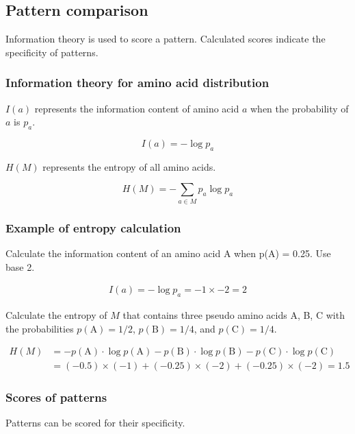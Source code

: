 %
%

%
%
\subsection{Pattern comparison}
Information theory is used to score a pattern. Calculated scores indicate the specificity of patterns.

%
%
\subsubsection*{Information theory for amino acid distribution}
$I(a)$ represents the information content of amino acid $a$ when the probability of $a$ is $p_a$. 

\[
I(a) = -\log⁡ p_a
\]

\noindent
$H(M)$ represents the entropy of all amino acids.

\[
H(M) = -\sum_{a \in M}p_a \log⁡ p_a
\]

%
%
\subsubsection*{Example of entropy calculation }
Calculate the information content of an amino acid A when p(A) = 0.25. Use base 2.

\begin{align*}
I(a) = -\log⁡ p_a = -1 \times -2 = 2
\end{align*}

\noindent
Calculate the entropy of $M$ that contains three pseudo amino acids A, B, C with the probabilities $p(\mathrm{A})=1/2$, $p(\mathrm{B})=1/4$, and $p(\mathrm{C})=1/4$. 

\begin{align*}
H(M) &= -p(\mathrm{A}) \cdot \log⁡ p(\mathrm{A}) - p(\mathrm{B})  \cdot  \log ⁡p(\mathrm{B} ) - p(\mathrm{C})  \cdot  \log⁡ p(\mathrm{C}) \\
 & = (-0.5) \times (-1) + (-0.25) \times (-2) + (-0.25) \times (-2) = 1.5
\end{align*}

%
%
\subsubsection*{Scores of patterns}
Patterns can be scored for their specificity. 

